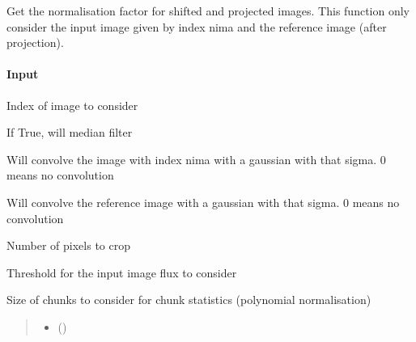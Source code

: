 \documentclass[letterpaper,10pt,english]{sphinxmanual}
\begin{document}
\begin{fulllineitems}
\begin{fulllineitems}
\label{\detokenize{api/pymusepipe:pymusepipe.align_pipe.AlignMuseDataset.get_normfactor_ima}}
\pysigstartsignatures
{}
\pysigstopsignatures
\sphinxAtStartPar
Get the normalisation factor for shifted and projected images. This function only
consider the input image given by index nima and the reference image (after
projection).


\paragraph{Input}
\label{\detokenize{api/pymusepipe:id7}}\begin{description}
\sphinxAtStartPar
Index of image to consider

\sphinxAtStartPar
If True, will median filter

\sphinxAtStartPar
Will convolve the image with index nima
with a gaussian with that sigma. 0 means no convolution

\sphinxAtStartPar
Will convolve the reference image
with a gaussian with that sigma. 0 means no convolution

\sphinxAtStartPar
Number of pixels to crop

\sphinxAtStartPar
Threshold for the input image flux to consider

\sphinxAtStartPar
Size of chunks to consider for chunk statistics (polynomial normalisation)

\end{description}
\begin{quote}\begin{description}
\begin{itemize}
\item {} 
\sphinxAtStartPar
{} ()


\end{itemize}
\end{description}
\end{quote}
\end{fulllineitems}
\end{fulllineitems}
\end{document}
